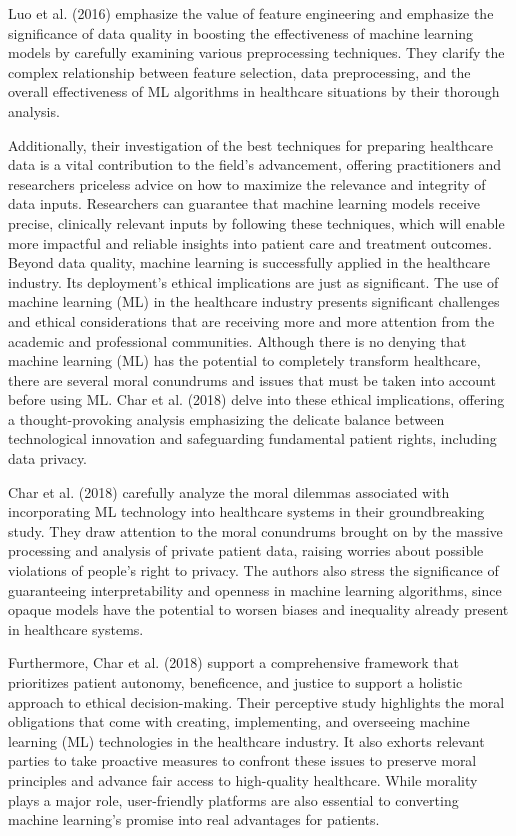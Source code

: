 \documentclass[conference]{IEEEtran}
\begin{document}
    Luo et al. (2016) \cite{luo2016review} emphasize the value of feature engineering and emphasize the significance of data quality in boosting the effectiveness of machine learning models by carefully examining various preprocessing techniques. They clarify the complex relationship between feature selection, data preprocessing, and the overall effectiveness of ML algorithms in healthcare situations by their thorough analysis.

    Additionally, their investigation of the best techniques for preparing healthcare data is a vital contribution to the field's advancement, offering practitioners and researchers priceless advice on how to maximize the relevance and integrity of data inputs. Researchers can guarantee that machine learning models receive precise, clinically relevant inputs by following these techniques, which will enable more impactful and reliable insights into patient care and treatment outcomes. Beyond data quality, machine learning is successfully applied in the healthcare industry. Its deployment's ethical implications are just as significant. The use of machine learning (ML) in the healthcare industry presents significant challenges and ethical considerations that are receiving more and more attention from the academic and professional communities. Although there is no denying that machine learning (ML) has the potential to completely transform healthcare, there are several moral conundrums and issues that must be taken into account before using ML. Char et al. (2018) \cite{char2018implementing} delve into these ethical implications, offering a thought-provoking analysis emphasizing the delicate balance between technological innovation and safeguarding fundamental patient rights, including data privacy.

Char et al. (2018) \cite{char2018implementing} carefully analyze the moral dilemmas associated with incorporating ML technology into healthcare systems in their groundbreaking study. They draw attention to the moral conundrums brought on by the massive processing and analysis of private patient data, raising worries about possible violations of people's right to privacy. The authors also stress the significance of guaranteeing interpretability and openness in machine learning algorithms, since opaque models have the potential to worsen biases and inequality already present in healthcare systems.

Furthermore, Char et al. (2018) \cite{char2018implementing} support a comprehensive framework that prioritizes patient autonomy, beneficence, and justice to support a holistic approach to ethical decision-making. Their perceptive study highlights the moral obligations that come with creating, implementing, and overseeing machine learning (ML) technologies in the healthcare industry. It also exhorts relevant parties to take proactive measures to confront these issues to preserve moral principles and advance fair access to high-quality healthcare. While morality plays a major role, user-friendly platforms are also essential to converting machine learning's promise into real advantages for patients.
\end{document}

